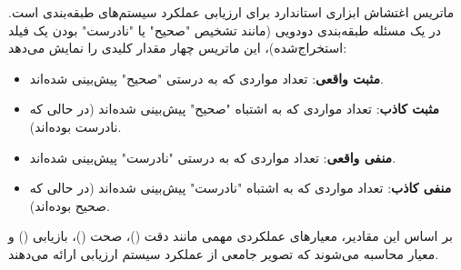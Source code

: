 ماتریس اغتشاش ابزاری استاندارد برای ارزیابی عملکرد سیستم‌های طبقه‌بندی است. در یک مسئله طبقه‌بندی دودویی (مانند تشخیص "صحیح" یا "نادرست" بودن یک فیلد استخراج‌شده)، این ماتریس چهار مقدار کلیدی را نمایش می‌دهد:
\begin{itemize}
	\item \textbf{مثبت واقعی}: تعداد مواردی که به درستی "صحیح" پیش‌بینی شده‌اند.
	\item \textbf{مثبت کاذب}: تعداد مواردی که به اشتباه "صحیح" پیش‌بینی شده‌اند (در حالی که نادرست بوده‌اند).
	\item \textbf{منفی واقعی}: تعداد مواردی که به درستی "نادرست" پیش‌بینی شده‌اند.
	\item \textbf{منفی کاذب}: تعداد مواردی که به اشتباه "نادرست" پیش‌بینی شده‌اند (در حالی که صحیح بوده‌اند).
\end{itemize}
بر اساس این مقادیر، معیارهای عملکردی مهمی مانند دقت ()، صحت ()، بازیابی () و معیار  محاسبه می‌شوند که تصویر جامعی از عملکرد سیستم ارزیابی ارائه می‌دهند.
